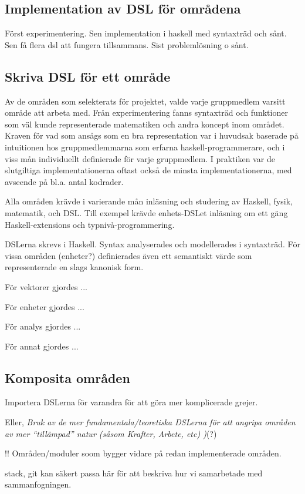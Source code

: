 \begin{binge}
  \section{Implementation av DSL för områdena}

  Först experimentering. Sen implementation i haskell med syntaxträd
  och sånt. Sen få flera dsl att fungera tillsammans. Sist
  problemlösning o sånt.

  \subsection{Skriva DSL för ett område}

  \begin{draft}
    Av de områden som selekterats för projektet, valde varje gruppmedlem
    varsitt område att arbeta med. Från experimentering fanns syntaxträd
    och funktioner som väl kunde representerade matematiken och andra
    koncept inom området. Kraven för vad som ansågs som en bra
    representation var i huvudsak baserade på intuitionen hos
    gruppmedlemmarna som erfarna haskell-programmerare, och i viss mån
    individuellt definierade för varje gruppmedlem. I praktiken var de
    slutgiltiga implementationerna oftast också de minsta
    implementationerna, med avseende på bl.a. antal kodrader.
  \end{draft}

  Alla områden krävde i varierande mån inläsning och studering av
  Haskell, fysik, matematik, och DSL. Till exempel krävde enhets-DSLet
  inläsning om ett gäng Haskell-extensions och typnivå-programmering.

  DSLerna skrevs i Haskell. Syntax analyserades och modellerades i
  syntaxträd. För vissa områden (enheter?) definierades även ett
  semantiskt värde som representerade en slags kanonisk form.

  För vektorer gjordes ...

  För enheter gjordes ...

  För analys gjordes ...

  För annat gjordes ...

  \subsection{Komposita områden}

  Importera DSLerna för varandra för att göra mer komplicerade grejer.

  Eller, \emph{Bruk av de mer fundamentala/teoretiska DSLerna för att
    angripa områden av mer ``tillämpad'' natur (såsom Krafter, Arbete,
    etc) )}(?)

  !! Områden/moduler soom bygger vidare på redan implementerade områden.

  stack, git kan säkert passa här för att beskriva hur vi samarbetade
  med sammanfogningen.
\end{binge}

